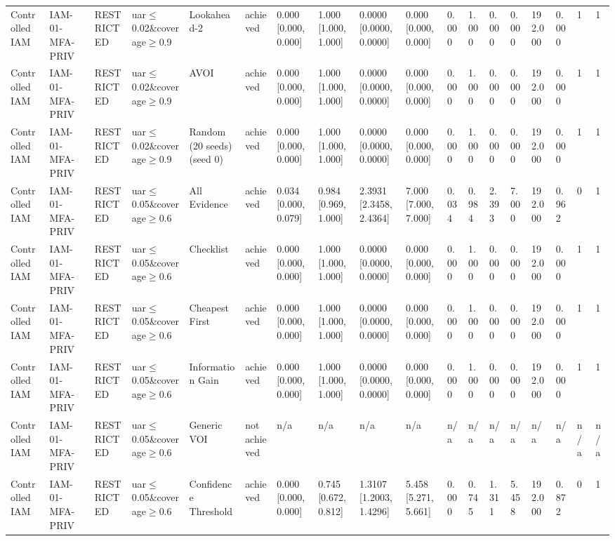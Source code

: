 \begin{table}[!ht]
{\begin{tabular}{llllllllllllllllll}
Controlled IAM & IAM-01-MFA-PRIV & RESTRICTED & uar$\le$0.02\&coverage$\ge$0.9 & Lookahead-2 & achieved & 0.000 [0.000, 0.000] & 1.000 [1.000, 1.000] & 0.0000 [0.0000, 0.0000] & 0.000 [0.000, 0.000] & 0.000 & 1.000 & 0.000 & 0.000 & 192.000 & 0.000 & 1 & 1 \\
Controlled IAM & IAM-01-MFA-PRIV & RESTRICTED & uar$\le$0.02\&coverage$\ge$0.9 & AVOI & achieved & 0.000 [0.000, 0.000] & 1.000 [1.000, 1.000] & 0.0000 [0.0000, 0.0000] & 0.000 [0.000, 0.000] & 0.000 & 1.000 & 0.000 & 0.000 & 192.000 & 0.000 & 1 & 1 \\
Controlled IAM & IAM-01-MFA-PRIV & RESTRICTED & uar$\le$0.02\&coverage$\ge$0.9 & Random (20 seeds) (seed 0) & achieved & 0.000 [0.000, 0.000] & 1.000 [1.000, 1.000] & 0.0000 [0.0000, 0.0000] & 0.000 [0.000, 0.000] & 0.000 & 1.000 & 0.000 & 0.000 & 192.000 & 0.000 & 1 & 1 \\
Controlled IAM & IAM-01-MFA-PRIV & RESTRICTED & uar$\le$0.05\&coverage$\ge$0.6 & All Evidence & achieved & 0.034 [0.000, 0.079] & 0.984 [0.969, 1.000] & 2.3931 [2.3458, 2.4364] & 7.000 [7.000, 7.000] & 0.034 & 0.984 & 2.393 & 7.000 & 192.000 & 0.962 & 0 & 1 \\
Controlled IAM & IAM-01-MFA-PRIV & RESTRICTED & uar$\le$0.05\&coverage$\ge$0.6 & Checklist & achieved & 0.000 [0.000, 0.000] & 1.000 [1.000, 1.000] & 0.0000 [0.0000, 0.0000] & 0.000 [0.000, 0.000] & 0.000 & 1.000 & 0.000 & 0.000 & 192.000 & 0.000 & 1 & 1 \\
Controlled IAM & IAM-01-MFA-PRIV & RESTRICTED & uar$\le$0.05\&coverage$\ge$0.6 & Cheapest First & achieved & 0.000 [0.000, 0.000] & 1.000 [1.000, 1.000] & 0.0000 [0.0000, 0.0000] & 0.000 [0.000, 0.000] & 0.000 & 1.000 & 0.000 & 0.000 & 192.000 & 0.000 & 1 & 1 \\
Controlled IAM & IAM-01-MFA-PRIV & RESTRICTED & uar$\le$0.05\&coverage$\ge$0.6 & Information Gain & achieved & 0.000 [0.000, 0.000] & 1.000 [1.000, 1.000] & 0.0000 [0.0000, 0.0000] & 0.000 [0.000, 0.000] & 0.000 & 1.000 & 0.000 & 0.000 & 192.000 & 0.000 & 1 & 1 \\
Controlled IAM & IAM-01-MFA-PRIV & RESTRICTED & uar$\le$0.05\&coverage$\ge$0.6 & Generic VOI & not achieved & n/a & n/a & n/a & n/a & n/a & n/a & n/a & n/a & n/a & n/a & n/a & n/a \\
Controlled IAM & IAM-01-MFA-PRIV & RESTRICTED & uar$\le$0.05\&coverage$\ge$0.6 & Confidence Threshold & achieved & 0.000 [0.000, 0.000] & 0.745 [0.672, 0.812] & 1.3107 [1.2003, 1.4296] & 5.458 [5.271, 5.661] & 0.000 & 0.745 & 1.311 & 5.458 & 192.000 & 0.872 & 0 & 1 \\

\end{tabular}}
\end{table}
